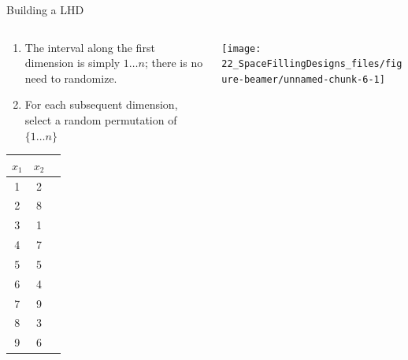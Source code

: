 \documentclass[
  9pt,
  ignorenonframetext,
]{beamer}
\begin{document}
\begin{frame}{Building a LHD}
\protect\hypertarget{building-a-lhd}{}
\begin{columns}
\begin{column}{0.6\textwidth}

\begin{enumerate}
  \item The interval along the first dimension is simply $1\ldots n$; there is no need to randomize.
  \item For each subsequent dimension, select a random permutation of $\{1\ldots n\}$
\end{enumerate}

\bigskip
\begin{center}
  \begin{tabular}{ccc}
    \toprule
    $x_1$ & $x_2$ \\
    \midrule
    1 & 2 \\
    2 & 8 \\
    3 & 1 \\
    4 & 7 \\
    5 & 5 \\
    6 & 4 \\
    7 & 9 \\
    8 & 3 \\
    9 & 6 \\
    \bottomrule
  \end{tabular}
\end{center}

\end{column}
\begin{column}{0.4\textwidth}


\begin{center}\texttt{[image: 22\_SpaceFillingDesigns\_files/figure-beamer/unnamed-chunk-6-1]} \end{center}

\end{column}
\end{columns}
\end{frame}
\end{document}
